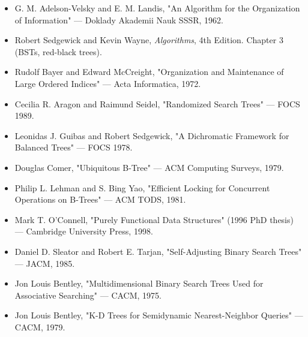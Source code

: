 \begin{itemize}
\item G. M. Adelson-Velsky and E. M. Landis, "An Algorithm for the Organization of Information" — Doklady Akademii Nauk SSSR, 1962.
\item Robert Sedgewick and Kevin Wayne, \textit{Algorithms}, 4th Edition. Chapter 3 (BSTs, red-black trees).
\item Rudolf Bayer and Edward McCreight, "Organization and Maintenance of Large Ordered Indices" — Acta Informatica, 1972.
\item Cecilia R. Aragon and Raimund Seidel, "Randomized Search Trees" — FOCS 1989.
\item Leonidas J. Guibas and Robert Sedgewick, "A Dichromatic Framework for Balanced Trees" — FOCS 1978.
\item Douglas Comer, "Ubiquitous B-Tree" — ACM Computing Surveys, 1979.
\item Philip L. Lehman and S. Bing Yao, "Efficient Locking for Concurrent Operations on B-Trees" — ACM TODS, 1981.
\item Mark T. O'Connell, "Purely Functional Data Structures" (1996 PhD thesis) — Cambridge University Press, 1998.
\item Daniel D. Sleator and Robert E. Tarjan, "Self-Adjusting Binary Search Trees" — JACM, 1985.
\item Jon Louis Bentley, "Multidimensional Binary Search Trees Used for Associative Searching" — CACM, 1975.
\item Jon Louis Bentley, "K-D Trees for Semidynamic Nearest-Neighbor Queries" — CACM, 1979.
\end{itemize}

